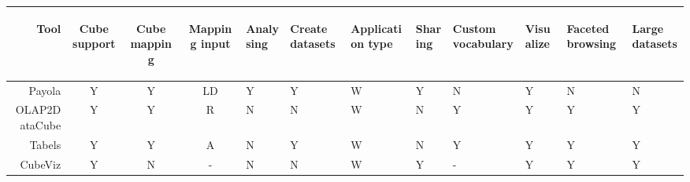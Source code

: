 \begin{tabularx}{\textwidth}{ |r|C|C|C|X|X|X|X|X|X|X|X| }
  \hline
      \begin{sideways}Tool\end{sideways} & 
      \centering\begin{sideways}Cube support\end{sideways} &
      \centering\begin{sideways}Cube mapping\end{sideways} &
      \centering\begin{sideways}Mapping input\end{sideways} &
      \centering\begin{sideways}Analysing\end{sideways} &
      \centering\begin{sideways}Create datasets\end{sideways} &
      \centering\begin{sideways}Application type\end{sideways} &
      \centering\begin{sideways}Sharing\end{sideways} &
      \centering\begin{sideways}Custom vocabulary\end{sideways} &
      \centering\begin{sideways}Visualize\end{sideways} &
      \centering\begin{sideways}Faceted browsing\end{sideways} &
      \begin{sideways}Large datasets\end{sideways}\\ \hline
  \hline
  Payola                   & Y & Y & LD & Y & Y & W & Y & N & Y & N & N \\ \hline
  OLAP2DataCube    & Y & Y & R  & N & N & W & N & Y & Y & Y & Y \\ \hline
  Tabels                   & Y & Y & A  & N & Y & W & N & Y & Y & Y & Y \\ \hline
  CubeViz                & Y & N & -  & N & N & W & Y & - & Y & Y & Y \\ \hline \hline 
  

\end{tabularx}
